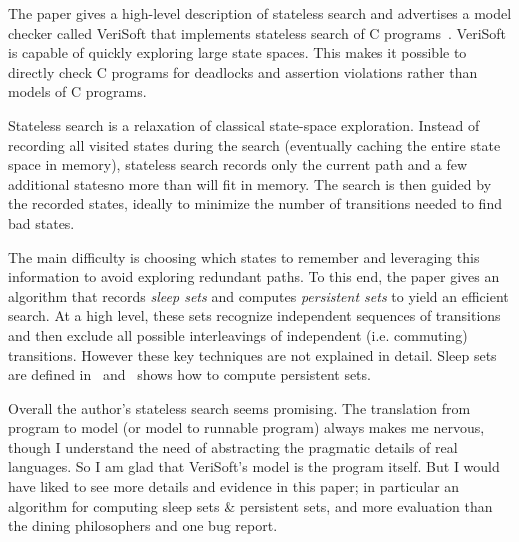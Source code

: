 \documentclass{article}
\begin{document}
\onehalfspacing

The paper gives a high-level description of stateless search and advertises
 a model checker called VeriSoft that implements stateless search of C
 programs~\cite{g-verisoft}.
VeriSoft is capable of quickly exploring large state spaces.
This makes it possible to directly check C programs for deadlocks and
 assertion violations rather than models of C programs.

Stateless search is a relaxation of classical state-space exploration.
Instead of recording all visited states during the search (eventually caching
 the entire state space in memory), stateless search records only the current
 path and a few additional states\textemdash no more than will fit in memory.
The search is then guided by the recorded states, ideally to
 minimize the number of transitions needed to find bad states.

The main difficulty is choosing which states to remember and leveraging this
 information to avoid exploring redundant paths.
To this end, the paper gives an algorithm that records \emph{sleep sets}
 and computes \emph{persistent sets} to yield an efficient search.
At a high level, these sets recognize independent sequences of transitions and
 then exclude all possible interleavings of independent (i.e. commuting) transitions.
However these key techniques are not explained in detail.
Sleep sets are defined in~\cite{g-using} and~\cite{gp-refining} shows how to compute
 persistent sets.

Overall the author's stateless search seems promising.
The translation from program to model (or model to runnable program) always
 makes me nervous, though I understand the need of abstracting the pragmatic
 details of real languages.
So I am glad that VeriSoft's model is the program itself.
But I would have liked to see more details and evidence in this paper; in
 particular an algorithm for computing sleep sets \& persistent sets, and
 more evaluation than the dining philosophers and one bug report.



\footnotesize


\end{document}
